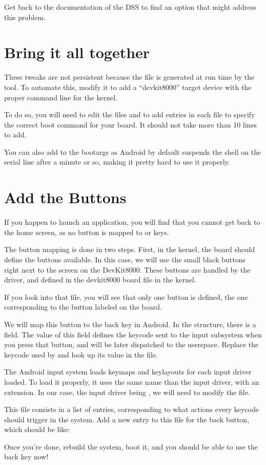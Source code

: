 Get back to the documentation of the DSS to find an option that might address
this problem.

\section{Bring it all together}

These tweaks are not persistent because the  file is generated at run
time by the  tool. To automate this, modify it to add
a ``devkit8000'' target device with the proper command line for the kernel.

To do so, you will need to edit the files
 and
 to add  entries in each
file to specify the correct boot command for your board. It should not take more than 10 lines to
add.

You can also add  to the bootargs as Android by
default suspends the shell on the serial line after a minute or so, making it pretty
hard to use it properly.

\section{Add the Buttons}

If you happen to launch an application, you will find that you cannot
get back to the home screen, as no button is mapped to  or 
keys.

The button mapping is done in two steps. First, in the kernel, the
board should define the buttons available. In this case, we will use
the small black buttons right next to the screen on the
DevKit8000. These buttons are handled by the  driver,
and defined in the devkit8000 board file in the kernel.

If you look into that file, you will see that only one button is
defined, the one corresponding to the button labeled 
on the board.

We will map this button to the back key in Android. In the
 structure, there is a  field. The
value of this field defines the keycode sent to the input
subsystem when you press that button, and will be later dispatched to
the userspace. Replace the keycode used by  and look up
its value in the  file.

The Android input system loads keymaps and keylayouts for each input
driver loaded. To load it properly, it uses the same name than the
input driver, with an extension. In our case, the input driver being
, we will need to modify the  file.

This file consists in a list of entries, corresponding to what actions
every keycode should trigger in the system. Add a new entry to this file
for the back button, which should be like:

Once you're done, rebuild the system, boot it, and you should be able
to use the back key now!
